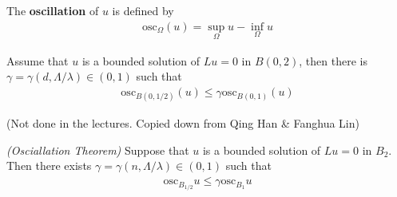 \documentclass[12pt,a4paper]{article}
\begin{document}
 The \textbf{oscillation} of $u$ is defined by
\begin{align*}
\text{osc}_{\Omega}(u) = \sup_{\Omega} u - \inf_{\Omega} u
\end{align*}
\s

\prop Assume that $u$ is a bounded solution of $Lu=0$ in $B(0, 2)$, then there is $\gamma = \gamma(d, \Lambda/\lambda) \in (0,1)$ such that
\begin{align*}
\text{osc}_{B(0, 1/2)}(u) \leq \gamma \text{osc}_{B(0,1)}(u)
\end{align*}
\s

\newday

(Not done in the lectures. Copied down from Qing Han \& Fanghua Lin)
\s

 \emph{(Osciallation Theorem)} Suppose that $u$ is a bounded solution of $Lu=0$ in $B_2$. Then there exists $\gamma =\gamma(n, \Lambda/\lambda)\in(0,1)$ such that
\begin{align*}
\text{osc}_{B_{1/2}}u \leq \gamma \text{osc}_{B_1} u
\end{align*}
\end{document}
